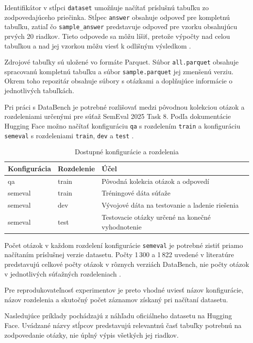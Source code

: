 Identifikátor v stĺpci \texttt{dataset} umožňuje načítať príslušnú tabuľku zo zodpovedajúceho priečinka. Stĺpec \texttt{answer} obsahuje odpoveď pre kompletnú tabuľku, zatiaľ čo \texttt{sample\_answer} predstavuje odpoveď pre vzorku obsahujúcu prvých 20 riadkov. Tieto odpovede sa môžu líšiť, pretože výpočty nad celou tabuľkou a nad jej vzorkou môžu viesť k odlišným výsledkom \cite{hfdatabench}.

Zdrojové tabuľky sú uložené vo formáte Parquet. Súbor \texttt{all.parquet} obsahuje spracovanú kompletnú tabuľku a súbor \texttt{sample.parquet} jej zmenšenú verziu. Okrem toho repozitár obsahuje súbory s otázkami a doplňujúce informácie o jednotlivých tabuľkách.

Pri práci s DataBench je potrebné rozlišovať medzi pôvodnou kolekciou otázok a rozdeleniami určenými pre súťaž SemEval 2025 Task 8. Podľa dokumentácie Hugging Face možno načítať konfiguráciu \texttt{qa} s rozdelením \texttt{train} a konfiguráciu \texttt{semeval} s rozdeleniami \texttt{train}, \texttt{dev} a \texttt{test} \cite{hfdatabench}.

\begin{table}[htbp]
\centering
\caption{Dostupné konfigurácie a rozdelenia}
\label{tab:configs}
\begin{tabularx}{\textwidth}{@{}>{\ttfamily}l >{\ttfamily}l X@{}}
\toprule
\textbf{Konfigurácia} & \textbf{Rozdelenie} & \textbf{Účel} \\
\midrule
qa      & train & Pôvodná kolekcia otázok a odpovedí \\
semeval & train & Tréningové dáta súťaže \\
semeval & dev   & Vývojové dáta na testovanie a ladenie riešenia \\
semeval & test  & Testovacie otázky určené na konečné vyhodnotenie \\
\bottomrule
\end{tabularx}
\end{table}

Počet otázok v každom rozdelení konfigurácie \texttt{semeval} je potrebné zistiť priamo načítaním príslušnej verzie datasetu. Počty 1\,300 a 1\,822 uvedené v literatúre predstavujú celkové počty otázok v rôznych verziách DataBench, nie počty otázok v jednotlivých súťažných rozdeleniach \cite{semeval,hfdatabench}.

Pre reprodukovateľnosť experimentov je preto vhodné uviesť názov konfigurácie, názov rozdelenia a skutočný počet záznamov získaný pri načítaní datasetu.

Nasledujúce príklady pochádzajú z náhľadu oficiálneho datasetu na Hugging Face. Uvádzané názvy stĺpcov predstavujú relevantnú časť tabuľky potrebnú na zodpovedanie otázky, nie úplný výpis všetkých jej riadkov.

